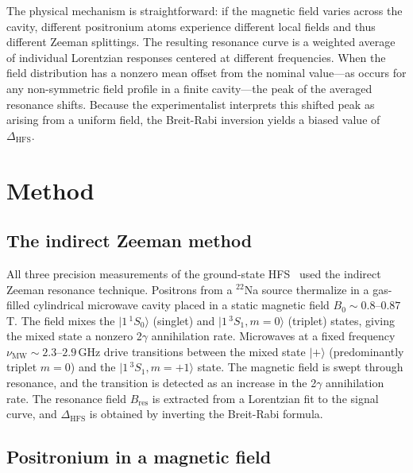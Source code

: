 \documentclass[twocolumn,pra,aps,superscriptaddress,floatfix,10pt]{revtex4-2}
\begin{document}
The physical mechanism is straightforward: if the magnetic field varies across the cavity, different positronium atoms experience different local fields and thus different Zeeman splittings. The resulting resonance curve is a weighted average of individual Lorentzian responses centered at different frequencies. When the field distribution has a nonzero mean offset from the nominal value---as occurs for any non-symmetric field profile in a finite cavity---the peak of the averaged resonance shifts. Because the experimentalist interprets this shifted peak as arising from a uniform field, the Breit-Rabi inversion yields a biased value of $\Delta_\mathrm{HFS}$.

\section{Method}
\label{sec:method}

\subsection{The indirect Zeeman method}
\label{sec:zeeman}

All three precision measurements of the ground-state HFS~\cite{Mills1975,Ritter1984,Ishida2014} used the indirect Zeeman resonance technique. Positrons from a $^{22}$Na source thermalize in a gas-filled cylindrical microwave cavity placed in a static magnetic field $B_0 \sim 0.8$--$0.87$\,T. The field mixes the $|1\,^1S_0\rangle$ (singlet) and $|1\,^3S_1, m=0\rangle$ (triplet) states, giving the mixed state a nonzero 2$\gamma$ annihilation rate. Microwaves at a fixed frequency $\nu_\mathrm{MW} \sim 2.3$--$2.9$\,GHz drive transitions between the mixed state $|+\rangle$ (predominantly triplet $m=0$) and the $|1\,^3S_1, m=+1\rangle$ state. The magnetic field is swept through resonance, and the transition is detected as an increase in the 2$\gamma$ annihilation rate. The resonance field $B_\mathrm{res}$ is extracted from a Lorentzian fit to the signal curve, and $\Delta_\mathrm{HFS}$ is obtained by inverting the Breit-Rabi formula.

\subsection{Positronium in a magnetic field}
\label{sec:hamiltonian}
\end{document}
